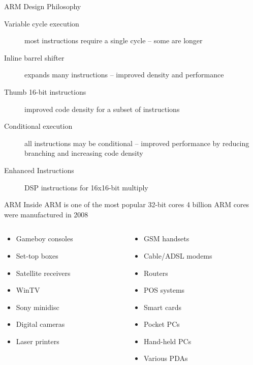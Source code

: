 \documentclass[svgnames,x11names]{beamer}
\begin{document}
\begin{frame}{ARM Design Philosophy}
  \begin{description}
  \item[Variable cycle execution] most instructions require a single
    cycle -- some are longer
  \item[Inline barrel shifter] expands many instructions -- improved
    density and performance
  \item[Thumb 16-bit instructions] improved code density for a subset
    of instructions
  \item[Conditional execution] all instructions may be conditional --
    improved performance by reducing branching and increasing code
    density
  \item[Enhanced Instructions] DSP instructions for 16x16-bit multiply
  \end{description}
\end{frame}

\begin{frame}{ARM Inside}
  ARM is one of the most popular 32-bit cores 4 billion ARM cores were
  manufactured in 2008
  \begin{columns}[onlytextwidth]
    \begin{column}{.5\textwidth}
      \begin{itemize}
      \item Gameboy consoles
      \item Set-top boxes
      \item Satellite receivers
      \item WinTV
      \item Sony minidisc
      \item Digital cameras
      \item Laser printers
      \end{itemize}
    \end{column}
    \begin{column}{.5\textwidth}
    \begin{itemize}
      \item GSM handsets
    \item Cable/ADSL modems
    \item Routers
    \item POS systems
    \item Smart cards
    \item Pocket PCs
    \item Hand-held PCs
    \item Various PDAs
    \end{itemize}
  \end{column}
\end{columns}
\end{frame}
\end{document}
